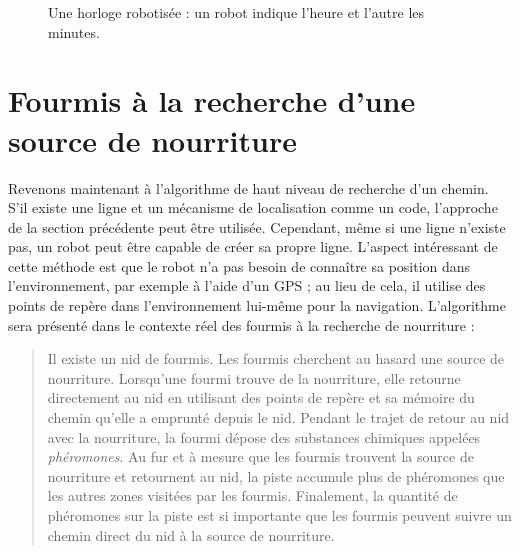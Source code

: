 \begin{figure}
\begin{center}
\end{center}
\caption{Une horloge robotisée : un robot indique l'heure et l'autre les minutes.}\label{fig.line-clock}
\end{figure}

\section[Fourmis à la recherche de la nourriture]{Fourmis à la recherche d'une source de nourriture}\label{s.ants}

Revenons maintenant à l'algorithme de haut niveau de recherche d'un chemin. S'il existe une ligne et un mécanisme de localisation comme un code, l'approche de la section précédente peut être utilisée. Cependant, même si une ligne n'existe pas, un robot peut être capable de créer sa propre ligne. L'aspect intéressant de cette méthode est que le robot n'a pas besoin de connaître sa position dans l'environnement, par exemple à l'aide d'un GPS ; au lieu de cela, il utilise des points de repère dans l'environnement lui-même pour la navigation. L'algorithme sera présenté dans le contexte réel des fourmis à la recherche de nourriture :

\begin{quote}
\normalsize Il existe un nid de fourmis. Les fourmis cherchent au hasard une source de nourriture. Lorsqu'une fourmi trouve de la nourriture, elle retourne directement au nid en utilisant des points de repère et sa mémoire du chemin qu'elle a emprunté depuis le nid. Pendant le trajet de retour au nid avec la nourriture, la fourmi dépose des substances chimiques appelées \emph{phéromones}. Au fur et à mesure que les fourmis trouvent la source de nourriture et retournent au nid, la piste accumule plus de phéromones que les autres zones visitées par les fourmis. Finalement, la quantité de phéromones sur la piste est si importante que les fourmis peuvent suivre un chemin direct du nid à la source de nourriture.
\end{quote}


